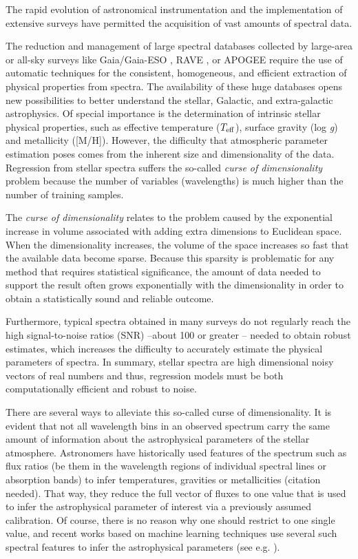 \documentclass[a4paper,fleqn,usenatbib]{mnras}
\begin{document}
The rapid evolution of astronomical instrumentation and the
implementation of extensive surveys have permitted the acquisition of
vast amounts of spectral data.  {The reduction and management of
  large spectral databases collected by large-area or all-sky surveys
  like Gaia/Gaia-ESO \citep{2006MNRAS.367..290J,2012Msngr.147...25G},
  RAVE \citep{2006AJ....132.1645S}, or APOGEE
  \citep{2011AJ....142...72E} require the use of automatic
  techniques for the consistent, homogeneous, and efficient
  extraction of physical properties from spectra. The availability
  of these huge databases opens new possibilities to better understand
  the stellar, Galactic, and extra-galactic astrophysics. Of
  special importance is the determination of intrinsic stellar
  physical properties, such as effective temperature ($T_{\rm eff}$),
  surface gravity (log \textit{g}) and metallicity ([M/H]). However,
  the difficulty that atmospheric parameter estimation poses comes
  from the inherent size and dimensionality of the data. 
  Regression from stellar spectra suffers the so-called {\sl curse
  of dimensionality} problem because the number of variables
  (wavelengths) is much higher than the number of training samples.
    
The \textit{curse of dimensionality} \citep{bellman:61} relates to 
the problem caused by the exponential increase in volume associated 
with adding extra dimensions to Euclidean space. 
When the dimensionality increases, the volume of the space increases so 
fast that the available data become sparse. Because this sparsity is 
problematic for any method that requires statistical significance, the 
amount of data needed to support the result often grows exponentially 
with the dimensionality in order to obtain a statistically sound and 
reliable outcome.

Furthermore, typical spectra obtained in many surveys do not 
regularly reach the high signal-to-noise ratios (SNR) --about
100 or greater -- needed to obtain robust estimates, which
increases the difficulty to accurately estimate the physical
parameters of spectra.  In summary, stellar spectra are high
dimensional noisy vectors of real numbers and thus,
regression models must be both computationally efficient and robust
to noise.


There are several ways to alleviate this so-called curse of dimensionality. It is evident that not all wavelength bins in an observed spectrum carry the same amount of information about the astrophysical parameters of the stellar atmosphere. Astronomers have historically used features of the spectrum such as flux ratios (be them in the wavelength regions of individual spectral lines or absorption bands) to infer temperatures, gravities or metallicities (citation needed). That way, they reduce the full vector of fluxes to one value that is used to infer the astrophysical parameter of interest via a previously assumed 
calibration. Of course, there is no reason why one should restrict to one single value, and recent works based on machine learning techniques use several such spectral features to infer the astrophysical parameters (see e.g. \citep{2006ApJ...636..804A}).


}
\end{document}
